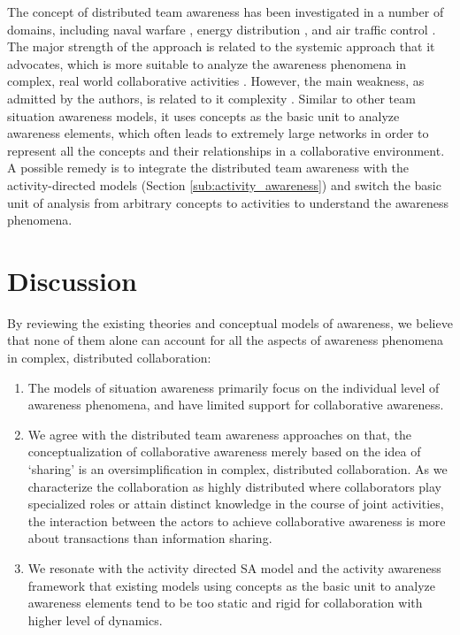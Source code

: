 The concept of distributed team awareness has been investigated in a number of domains, including naval warfare \cite{Stanton2006}, energy distribution \cite{Salmon2008a}, and air traffic control \cite{Stanton2009}. The major strength of the approach is related to the systemic approach that it advocates, which is more suitable to analyze the awareness phenomena in complex, real world collaborative activities \cite{Stanton2009}. However, the main weakness, as admitted by the authors, is related to it complexity \cite{Salmon2010}. Similar to other team situation awareness models, it uses concepts as the basic unit to analyze awareness elements, which often leads to extremely large networks in order to represent all the concepts and their relationships in a collaborative environment. A possible remedy is to integrate the distributed team awareness with the activity-directed models (Section \ref{sub:activity_awareness}) and switch the basic unit of analysis from arbitrary concepts to activities to understand the awareness phenomena.

\section{Discussion} %
\label{cha:understanding_awareness:sec:discussion}
By reviewing the existing theories and conceptual models of awareness, we believe that none of them alone can account for all the aspects of awareness phenomena in complex, distributed collaboration:

\begin{enumerate}
   \item The models of situation awareness primarily focus on the individual level of awareness phenomena, and have limited support for collaborative awareness. 
   \item We agree with the distributed team awareness approaches \cite{Salmon2010} on that, the conceptualization of collaborative awareness merely based on the idea of `sharing' is an oversimplification in complex, distributed collaboration. As we characterize the collaboration as highly distributed where collaborators play specialized roles or attain distinct knowledge in the course of joint activities, the interaction between the actors to achieve collaborative awareness is more about transactions than information sharing.
   \item We resonate with the activity directed SA model \cite{Bedny1999} and the activity awareness framework \cite{carroll2003a} that existing models using concepts as the basic unit to analyze awareness elements tend to be too static and rigid for collaboration with higher level of dynamics.
\end{enumerate}

